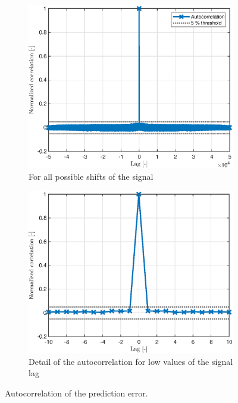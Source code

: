 \begin{figure}[hbp]
    \centering
\begin{subfigure}{0.49\textwidth}
    \centering
    \includegraphics[width=\textwidth]{figures/8/validation-pred-error.eps}
    \caption{For all possible shifts of the signal}
    \label{fig:8-validation-pred-error-global}
    \end{subfigure}
    \hfill
    \begin{subfigure}{0.49\textwidth}
    \centering
    \includegraphics[width=\textwidth]{figures/8/validation-pred-error-detail.eps}
    \caption{Detail of the autocorrelation for low values of the signal lag}
    \label{fig:8-validation-pred-error-detail}
    \end{subfigure}
    
    \caption{Autocorrelation of the prediction error.}
    \label{fig:8-validation-pred-error}
\end{figure}

